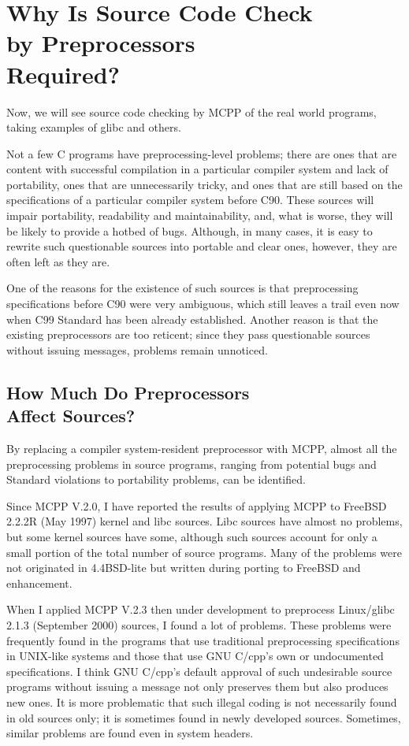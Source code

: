 \documentclass[twocolumn]{article}
\begin{document}
\section{Why Is Source Code Check \\
by Preprocessors\\
 Required?}

Now, we will see source code checking by MCPP of the real world programs, taking examples of glibc and others.

Not a few C programs have preprocessing-level problems; there are ones that are content with successful compilation in a particular compiler system and lack of portability, ones that are unnecessarily tricky, and ones that are still based on the specifications of a particular compiler system before C90.  These sources will impair portability, readability and maintainability, and, what is worse, they will be likely to provide a hotbed of bugs.  Although, in many cases, it is easy to rewrite such questionable sources into portable and clear ones, however, they are often left as they are.

One of the reasons for the existence of such sources is that preprocessing specifications before C90 were very ambiguous, which still leaves a trail even now when C99 Standard has been already established.  Another reason is that the existing preprocessors are too reticent; since they pass questionable sources without issuing messages, problems remain unnoticed.

\subsection{How Much Do Preprocessors\\
 Affect Sources?}

By replacing a compiler system-resident preprocessor with MCPP, almost all the preprocessing problems in source programs, ranging from potential bugs and Standard violations to portability problems, can be identified.

Since MCPP V.2.0, I have reported the results of applying MCPP to FreeBSD 2.2.2R (May 1997) kernel and libc sources.  Libc sources have almost no problems, but some kernel sources have some, although such sources account for only a small portion of the total number of source programs.  Many of the problems were not originated in 4.4BSD-lite but written during porting to FreeBSD and enhancement.

When I applied MCPP V.2.3 then under development to preprocess Linux/glibc 2.1.3 (September 2000) sources, I found a lot of problems.  These problems were frequently found in the programs that use traditional preprocessing specifications in UNIX-like systems and those that use GNU C/cpp's own or undocumented specifications.  I think GNU C/cpp's default approval of such undesirable source programs without issuing a message not only preserves them but also produces new ones.  It is more problematic that such illegal coding is not necessarily found in old sources only; it is sometimes found in newly developed sources.  Sometimes, similar problems are found even in system headers.
\end{document}
